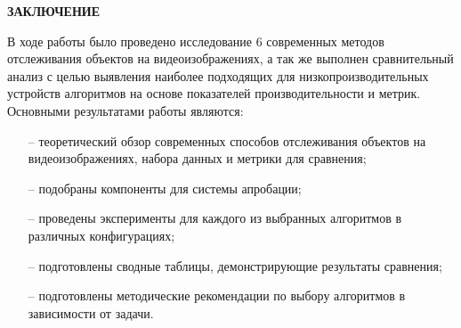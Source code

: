 \newpage
\begin{flushleft}
  \textbf{\large ЗАКЛЮЧЕНИЕ}
\end{flushleft}


В ходе работы было проведено исследование 6 современных методов отслеживания объектов на видеоизображениях, а так же выполнен сравнительный анализ с целью выявления наиболее подходящих для низкопроизводительных устройств алгоритмов на основе показателей производительности и метрик.
Основными результатами работы являются:
\begin{itemize}
  \item[--] теоретический обзор современных способов отслеживания объектов на видеоизображениях, набора данных и метрики для сравнения;
  \item[--] подобраны компоненты для системы апробации;
  \item[--] проведены эксперименты для каждого из выбранных алгоритмов в различных конфигурациях;
  \item[--] подготовлены сводные таблицы, демонстрирующие результаты сравнения; 
  \item[--] подготовлены методические рекомендации по выбору алгоритмов в зависимости от задачи.
\end{itemize}

